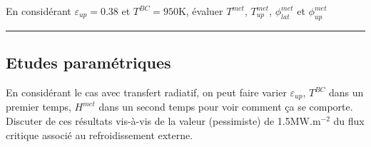 \documentclass[3p]{elsarticle}
\newenvironment{remark}[1][\textit{Nota Bene}]{\begin{trivlist}
\item[\hskip \labelsep {\bfseries \rule{1ex}{1ex} #1}]\ignorespaces}{\rule{1ex}{1ex} \end{trivlist}\ignorespacesafterend}
\newcounter{question}
\newcommand{\Q}[1]{\stepcounter{question}\begin{remark}[Q\arabic{question}]#1~~\end{remark}}
\begin{document}
\Q{En considérant $\varepsilon_{up} = 0.38$ et $T^{BC}=950$K, évaluer \(T^{met}\), \(T_{up}^{met}\), \(\phi_{lat}^{met}\) et \(\phi_{up}^{met}\)}

\subsection{Etudes paramétriques} \label{sect:param}

En considérant le cas avec transfert radiatif, on peut faire varier $\varepsilon_{up}$, $T^{BC}$ dans un premier temps, $H^{met}$ dans un second temps pour voir comment ça se comporte. Discuter de ces résultats vis-à-vis de la valeur (pessimiste) de 1.5MW.m$^{-2}$ du flux critique associé au refroidissement externe.


\end{document}
